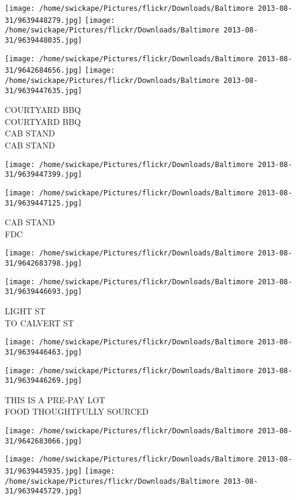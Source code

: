 \documentclass[10pt,letterpaper]{article}
\begin{document}
\texttt{[image: /home/swickape/Pictures/flickr/Downloads/Baltimore 2013-08-31/9639448279.jpg]}
\texttt{[image: /home/swickape/Pictures/flickr/Downloads/Baltimore 2013-08-31/9639448035.jpg]}

\texttt{[image: /home/swickape/Pictures/flickr/Downloads/Baltimore 2013-08-31/9642684656.jpg]}
\texttt{[image: /home/swickape/Pictures/flickr/Downloads/Baltimore 2013-08-31/9639447635.jpg]}

COURTYARD BBQ\\
COURTYARD BBQ\\
CAB STAND\\
CAB STAND\\
\pagebreak

\texttt{[image: /home/swickape/Pictures/flickr/Downloads/Baltimore 2013-08-31/9639447399.jpg]}

\vspace{0.25in}
\texttt{[image: /home/swickape/Pictures/flickr/Downloads/Baltimore 2013-08-31/9639447125.jpg]}

CAB STAND\\
FDC\\
\pagebreak

\texttt{[image: /home/swickape/Pictures/flickr/Downloads/Baltimore 2013-08-31/9642683798.jpg]}

\vspace{0.25in}
\texttt{[image: /home/swickape/Pictures/flickr/Downloads/Baltimore 2013-08-31/9639446693.jpg]}

LIGHT ST\\
TO CALVERT ST\\
\pagebreak

\texttt{[image: /home/swickape/Pictures/flickr/Downloads/Baltimore 2013-08-31/9639446463.jpg]}

\vspace{0.25in}
\texttt{[image: /home/swickape/Pictures/flickr/Downloads/Baltimore 2013-08-31/9639446269.jpg]}

THIS IS A PRE{-}PAY LOT\\
FOOD THOUGHTFULLY SOURCED\\
\pagebreak

\texttt{[image: /home/swickape/Pictures/flickr/Downloads/Baltimore 2013-08-31/9642683066.jpg]}

\vspace{0.25in}
\texttt{[image: /home/swickape/Pictures/flickr/Downloads/Baltimore 2013-08-31/9639445935.jpg]}
\texttt{[image: /home/swickape/Pictures/flickr/Downloads/Baltimore 2013-08-31/9639445729.jpg]}
\end{document}
